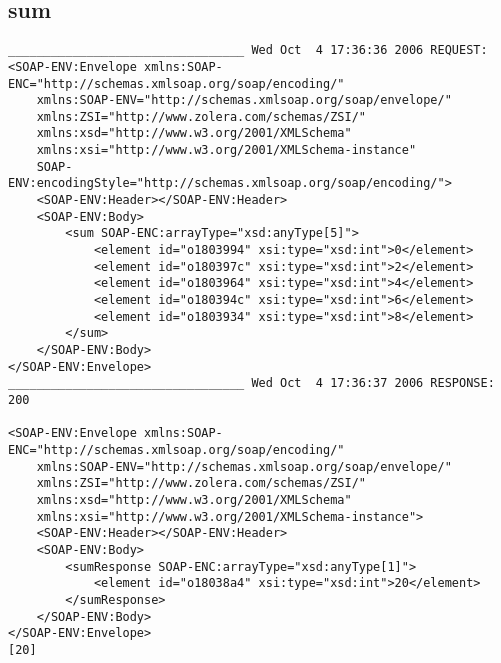 \subsection{sum}
\begin{verbatim}
_________________________________ Wed Oct  4 17:36:36 2006 REQUEST:
<SOAP-ENV:Envelope xmlns:SOAP-ENC="http://schemas.xmlsoap.org/soap/encoding/"
	xmlns:SOAP-ENV="http://schemas.xmlsoap.org/soap/envelope/"
	xmlns:ZSI="http://www.zolera.com/schemas/ZSI/"
	xmlns:xsd="http://www.w3.org/2001/XMLSchema"
	xmlns:xsi="http://www.w3.org/2001/XMLSchema-instance"
	SOAP-ENV:encodingStyle="http://schemas.xmlsoap.org/soap/encoding/">
	<SOAP-ENV:Header></SOAP-ENV:Header>
	<SOAP-ENV:Body>
		<sum SOAP-ENC:arrayType="xsd:anyType[5]">
			<element id="o1803994" xsi:type="xsd:int">0</element>
			<element id="o180397c" xsi:type="xsd:int">2</element>
			<element id="o1803964" xsi:type="xsd:int">4</element>
			<element id="o180394c" xsi:type="xsd:int">6</element>
			<element id="o1803934" xsi:type="xsd:int">8</element>
		</sum>
	</SOAP-ENV:Body>
</SOAP-ENV:Envelope>
_________________________________ Wed Oct  4 17:36:37 2006 RESPONSE:
200

<SOAP-ENV:Envelope xmlns:SOAP-ENC="http://schemas.xmlsoap.org/soap/encoding/"
	xmlns:SOAP-ENV="http://schemas.xmlsoap.org/soap/envelope/"
	xmlns:ZSI="http://www.zolera.com/schemas/ZSI/"
	xmlns:xsd="http://www.w3.org/2001/XMLSchema"
	xmlns:xsi="http://www.w3.org/2001/XMLSchema-instance">
	<SOAP-ENV:Header></SOAP-ENV:Header>
	<SOAP-ENV:Body>
		<sumResponse SOAP-ENC:arrayType="xsd:anyType[1]">
			<element id="o18038a4" xsi:type="xsd:int">20</element>
		</sumResponse>
	</SOAP-ENV:Body>
</SOAP-ENV:Envelope>
[20]
\end{verbatim}

